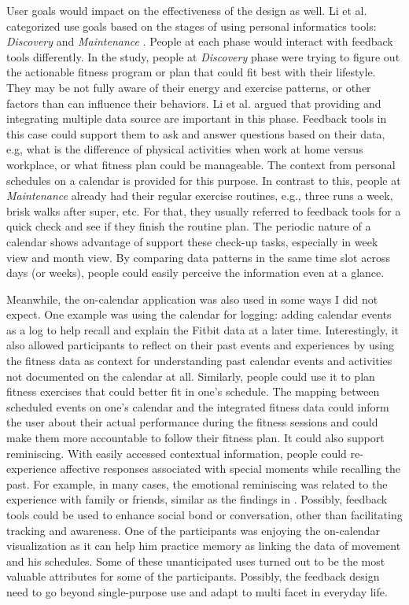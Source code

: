 \documentclass[12pt,oneside]{book}
\begin{document}
User goals would impact on the effectiveness of the design as well. Li et al. categorized use goals based on the stages of using personal informatics tools: \textit{Discovery} and \textit{Maintenance} \cite{li_understanding_2011}. People at each phase would interact with feedback tools differently. In the study, people at \textit{Discovery} phase were trying to figure out the actionable fitness program or plan that could fit best with their lifestyle. They may be not fully aware of their energy and exercise patterns, or other factors than can influence their behaviors. Li et al. argued that providing and integrating multiple data source are important in this phase. Feedback tools in this case could support them to ask and answer questions based on their data, e.g, what is the difference of physical activities when work at home versus workplace, or what fitness plan could be manageable. The context from personal schedules on a calendar is provided for this purpose.
In contrast to this, people at \textit{Maintenance} already had their regular exercise routines, e.g., three runs a week, brisk walks after super, etc. For that, they usually referred to feedback tools for a quick check and see if they finish the routine plan. The periodic nature of a calendar shows advantage of support these check-up tasks, especially in week view and month view. By comparing data patterns in the same time slot across days (or weeks), people could easily perceive the information even at a glance.

Meanwhile, the on-calendar application was also used in some ways I did not expect. One example was using the calendar for logging: adding calendar events as a log to help recall and explain the Fitbit data at a later time. Interestingly, it also allowed participants to reflect on their past events and experiences by using the fitness data as context for understanding past calendar events and activities not documented on the calendar at all. Similarly, people could use it to plan fitness exercises that could better fit in one's schedule. The mapping between scheduled events on one's calendar and the integrated fitness data could inform the user about their actual performance during the fitness sessions and could make them more accountable to follow their fitness plan. It could also support reminiscing. With easily accessed contextual information, people could re-experience affective responses associated with special moments while recalling the past. For example, in many cases, the emotional reminiscing was related to the experience with family or friends, similar as the findings in \cite{thudt_visual_2015}. Possibly, feedback tools could be used to enhance social bond or conversation, other than facilitating tracking and awareness. One of the participants was enjoying the on-calendar visualization as it can help him practice memory as linking the data of movement and his schedules. Some of these unanticipated uses turned out to be the most valuable attributes for some of the participants. Possibly, the feedback design need to go beyond single-purpose use and adapt to multi facet in everyday life.
\end{document}
